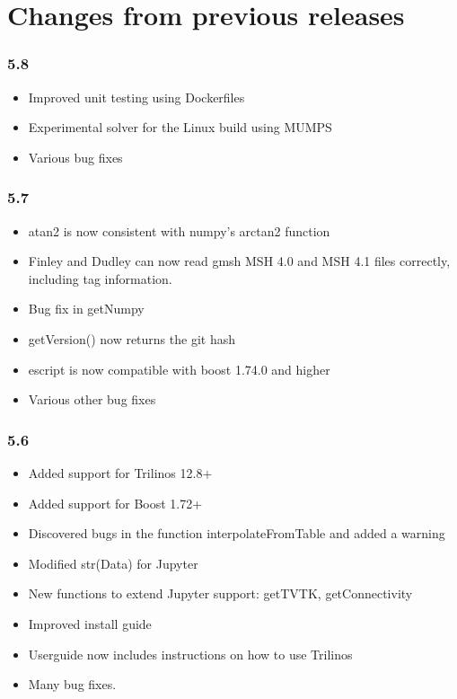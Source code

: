 
%
%
%

\chapter{Changes from previous releases}
\label{app:changes}

\subsection*{5.8}
\begin{itemize}
\item Improved unit testing using Dockerfiles
\item Experimental solver for the Linux build using MUMPS
\item Various bug fixes
\end{itemize}

\subsection*{5.7}
\begin{itemize}
\item atan2 is now consistent with numpy's arctan2 function
\item Finley and Dudley can now read gmsh MSH 4.0 and MSH 4.1 files correctly, including tag information.
\item Bug fix in getNumpy
\item getVersion() now returns the git hash
\item escript is now compatible with boost 1.74.0 and higher
\item Various other bug fixes
\end{itemize}

\subsection*{5.6}
\begin{itemize}
\item Added support for Trilinos 12.8+
\item Added support for Boost 1.72+
\item Discovered bugs in the function interpolateFromTable and added a warning
\item Modified str(Data) for Jupyter
\item New functions to extend Jupyter support: getTVTK, getConnectivity
\item Improved install guide
\item Userguide now includes instructions on how to use Trilinos
\item Many bug fixes.
\end{itemize}

